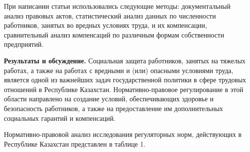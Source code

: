 \begin{multicols}{2}
При написании статьи использовались следующие методы: документальный
анализ правовых актов, статистический анализ данных по численности
работников, занятых во вредных условиях труда, и их компенсации,
сравнительный анализ компенсаций по различным формам собственности
предприятий.

{\bfseries Результаты и обсуждение.} Социальная защита работников, занятых
на тяжелых работах, а также на работах с вредными и (или) опасными
условиями труда, является одной из важнейших задач государственной
политики в сфере трудовых отношений в Республике Казахстан.
Нормативно-правовое регулирование в этой области направлено на создание
условий, обеспечивающих здоровье и безопасность работников, а также на
предоставление им дополнительных социальных гарантий и компенсаций.

Нормативно-правовой анализ исследования регуляторных норм, действующих в
Республике Казахстан представлен в таблице 1.
\end{multicols}

